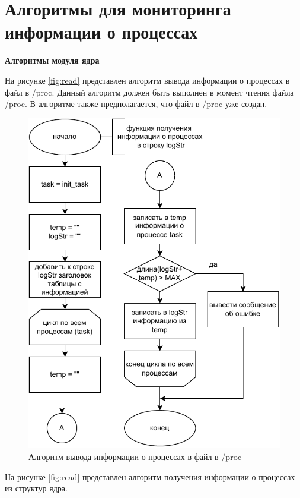 \section{Алгоритмы для мониторинга информации о процессах}

\textbf{Алгоритмы модуля ядра}

На рисунке \ref{fig:read} представлен алгоритм вывода информации о процессах в файл в /proc. Данный алгоритм должен быть выполнен в момент чтения файла /proc. В алгоритме также предполагается, что файл в /proc уже создан. 

\begin{figure}[H]
	\centering
	\includegraphics[scale=1]{img/os-l1.pdf}
	\caption{Алгоритм вывода информации о процессах в файл в /proc }
	\label{fig:printTasks}
\end{figure}
\newpage
На рисунке \ref{fig:read} представлен алгоритм получения информации о процессах из структур ядра. 

